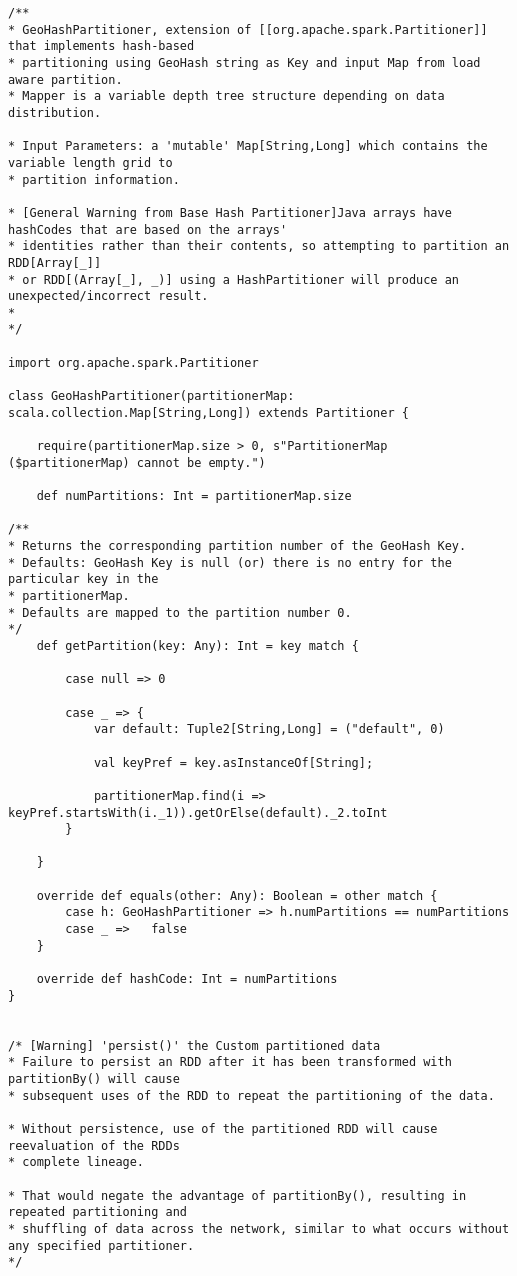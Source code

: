 \documentclass[article,type=msc,colorback,12pt,accentcolor=tud1d]{tudthesis}
\begin{document}
\begin{lstlisting}
/**
* GeoHashPartitioner, extension of [[org.apache.spark.Partitioner]] that implements hash-based 
* partitioning using GeoHash string as Key and input Map from load aware partition.
* Mapper is a variable depth tree structure depending on data distribution. 

* Input Parameters: a 'mutable' Map[String,Long] which contains the variable length grid to 
* partition information. 

* [General Warning from Base Hash Partitioner]Java arrays have hashCodes that are based on the arrays'
* identities rather than their contents, so attempting to partition an RDD[Array[_]] 
* or RDD[(Array[_], _)] using a HashPartitioner will produce an unexpected/incorrect result.
* 
*/

import org.apache.spark.Partitioner

class GeoHashPartitioner(partitionerMap: scala.collection.Map[String,Long]) extends Partitioner {

	require(partitionerMap.size > 0, s"PartitionerMap ($partitionerMap) cannot be empty.")

	def numPartitions: Int = partitionerMap.size
	
/**
* Returns the corresponding partition number of the GeoHash Key. 
* Defaults: GeoHash Key is null (or) there is no entry for the particular key in the 
* partitionerMap. 
* Defaults are mapped to the partition number 0. 
*/
	def getPartition(key: Any): Int = key match {
		
		case null => 0
		
		case _ => {
			var default: Tuple2[String,Long] = ("default", 0)
			
			val keyPref = key.asInstanceOf[String];
			
			partitionerMap.find(i => keyPref.startsWith(i._1)).getOrElse(default)._2.toInt
		}
	
	}
	
	override def equals(other: Any): Boolean = other match {
		case h: GeoHashPartitioner => h.numPartitions == numPartitions
		case _ => 	false
	}
	
	override def hashCode: Int = numPartitions
}


/* [Warning] 'persist()' the Custom partitioned data
* Failure to persist an RDD after it has been transformed with partitionBy() will cause 
* subsequent uses of the RDD to repeat the partitioning of the data. 

* Without persistence, use of the partitioned RDD will cause reevaluation of the RDDs 
* complete lineage. 

* That would negate the advantage of partitionBy(), resulting in repeated partitioning and 
* shuffling of data across the network, similar to what occurs without any specified partitioner.
*/
\end{lstlisting}
			
\end{document}
